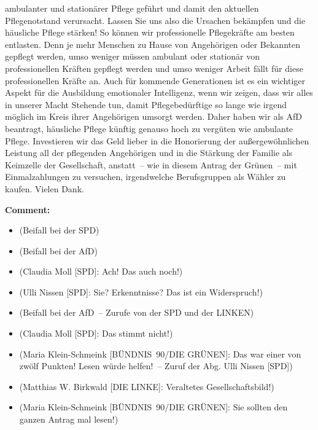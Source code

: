 \documentclass{article}
\begin{document}
ambulanter und stationärer Pflege geführt und damit den aktuellen Pflegenotstand verursacht. Lassen Sie uns also die Ursachen bekämpfen und die häusliche Pflege stärken! So können wir professionelle Pflegekräfte am besten entlasten. Denn je mehr Menschen zu Hause von Angehörigen oder Bekannten gepflegt werden, umso weniger müssen ambulant oder stationär von professionellen Kräften gepflegt werden und umso weniger Arbeit fällt für diese professionellen Kräfte an. Auch für kommende Generationen ist es ein wichtiger Aspekt für die Ausbildung emotionaler Intelligenz, wenn wir zeigen, dass wir alles in unserer Macht Stehende tun, damit Pflegebedürftige so lange wie irgend möglich im Kreis ihrer Angehörigen umsorgt werden. Daher haben wir als AfD beantragt, häusliche Pflege künftig genauso hoch zu vergüten wie ambulante Pflege. Investieren wir das Geld lieber in die Honorierung der außergewöhnlichen Leistung all der pflegenden Angehörigen und in die Stärkung der Familie als Keimzelle der Gesellschaft,  anstatt – wie in diesem Antrag der Grünen – mit Einmalzahlungen zu versuchen, irgendwelche Berufsgruppen als Wähler zu kaufen.  Vielen Dank.  

\noindent\textbf{Comment:}
\begin{itemize}
    \setlength\itemsep{-3pt}
    \item (Beifall bei der SPD)
    \setlength\itemsep{-3pt}
    \item (Beifall bei der AfD)
    \setlength\itemsep{-3pt}
    \item (Claudia Moll [SPD]: Ach! Das auch noch!)
    \setlength\itemsep{-3pt}
    \item (Ulli Nissen [SPD]: Sie? Erkenntnisse? Das ist ein Widerspruch!)
    \setlength\itemsep{-3pt}
    \item (Beifall bei der AfD – Zurufe von der SPD und der LINKEN)
    \setlength\itemsep{-3pt}
    \item (Claudia Moll [SPD]: Das stimmt nicht!)
    \setlength\itemsep{-3pt}
    \item (Maria Klein-Schmeink [BÜNDNIS 90/DIE GRÜNEN]: Das war einer von zwölf Punkten! Lesen würde helfen! – Zuruf der Abg. Ulli Nissen [SPD])
    \setlength\itemsep{-3pt}
    \item (Matthias W. Birkwald [DIE LINKE]: Veraltetes Gesellschaftsbild!)
    \setlength\itemsep{-3pt}
    \item (Maria Klein-Schmeink [BÜNDNIS 90/DIE GRÜNEN]: Sie sollten den ganzen Antrag mal lesen!)
\end{itemize}
\end{document}

